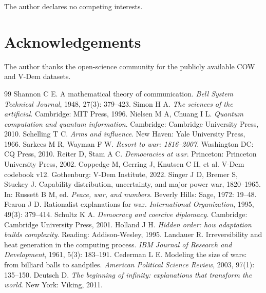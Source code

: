 \documentclass[11pt,a4paper]{article}
\begin{document}
The author declares no competing interests.

\section*{Acknowledgements}

The author thanks the open-science community for the publicly available COW and V-Dem datasets.

\begin{thebibliography}{99}
 Shannon C E. A mathematical theory of communication. \textit{Bell System Technical Journal}, 1948, 27(3): 379--423.
 Simon H A. \textit{The sciences of the artificial}. Cambridge: MIT Press, 1996.
 Nielsen M A, Chuang I L. \textit{Quantum computation and quantum information}. Cambridge: Cambridge University Press, 2010.
 Schelling T C. \textit{Arms and influence}. New Haven: Yale University Press, 1966.
 Sarkees M R, Wayman F W. \textit{Resort to war: 1816--2007}. Washington DC: CQ Press, 2010.
 Reiter D, Stam A C. \textit{Democracies at war}. Princeton: Princeton University Press, 2002.
 Coppedge M, Gerring J, Knutsen C H, et al. V-Dem codebook v12. Gothenburg: V-Dem Institute, 2022.
 Singer J D, Bremer S, Stuckey J. Capability distribution, uncertainty, and major power war, 1820--1965. In: Russett B M, ed. \textit{Peace, war, and numbers}. Beverly Hills: Sage, 1972: 19--48.
 Fearon J D. Rationalist explanations for war. \textit{International Organization}, 1995, 49(3): 379--414.
 Schultz K A. \textit{Democracy and coercive diplomacy}. Cambridge: Cambridge University Press, 2001.
 Holland J H. \textit{Hidden order: how adaptation builds complexity}. Reading: Addison-Wesley, 1995.
 Landauer R. Irreversibility and heat generation in the computing process. \textit{IBM Journal of Research and Development}, 1961, 5(3): 183--191.
 Cederman L E. Modeling the size of wars: from billiard balls to sandpiles. \textit{American Political Science Review}, 2003, 97(1): 135--150.
 Deutsch D. \textit{The beginning of infinity: explanations that transform the world}. New York: Viking, 2011.
\end{thebibliography}

\clearpage
\end{document}
